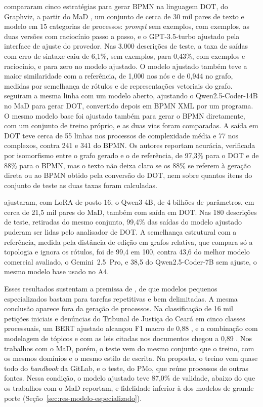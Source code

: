  compararam cinco estratégias para gerar BPMN na linguagem DOT, do Graphviz, a partir do MaD \cite{li2023mad}, um conjunto de cerca de 30 mil pares de texto e modelo em 15 categorias de processos: \textit{prompt} sem exemplos, com exemplos, as duas versões com raciocínio passo a passo, e o GPT-3.5-turbo ajustado pela interface de ajuste do provedor. Nas 3.000 descrições de teste, a taxa de saídas com erro de sintaxe caiu de 6,1\%, sem exemplos, para 0,43\%, com exemplos e raciocínio, e para zero no modelo ajustado. O modelo ajustado também teve a maior similaridade com a referência, de 1,000 nos nós e de 0,944 no grafo, medidas por semelhança de rótulos e de representações vetoriais do grafo.  seguiram a mesma linha com um modelo aberto, ajustando o Qwen2.5-Coder-14B no MaD para gerar DOT, convertido depois em BPMN XML por um programa. O mesmo modelo base foi ajustado também para gerar o BPMN diretamente, com um conjunto de treino próprio, e as duas vias foram comparadas. A saída em DOT teve cerca de 55 linhas nos processos de complexidade média e 77 nos complexos, contra 241 e 341 do BPMN. Os autores reportam acurácia, verificada por isomorfismo entre o grafo gerado e o de referência, de 97,3\% para o DOT e de 88\% para o BPMN, mas o texto não deixa claro se os 88\% se referem à geração direta ou ao BPMN obtido pela conversão do DOT, nem sobre quantos itens do conjunto de teste as duas taxas foram calculadas.

 ajustaram, com LoRA de posto 16, o Qwen3-4B, de 4 bilhões de parâmetros, em cerca de 21,5 mil pares do MaD, também com saída em DOT. Nas 180 descrições de teste, retiradas do mesmo conjunto, 99,4\% das saídas do modelo ajustado puderam ser lidas pelo analisador de DOT. A semelhança estrutural com a referência, medida pela distância de edição em grafos relativa, que compara só a topologia e ignora os rótulos, foi de 99,4 em 100, contra 43,6 do melhor modelo comercial avaliado, o Gemini~2.5~Pro, e 38,5 do Qwen2.5-Coder-7B sem ajuste, o mesmo modelo base usado no A4.

Esses resultados sustentam a premissa de , de que modelos pequenos especializados bastam para tarefas repetitivas e bem delimitadas. A mesma conclusão aparece fora da geração de processos. Na classificação de 16 mil petições iniciais e denúncias do Tribunal de Justiça do Ceará em cinco classes processuais, um BERT ajustado alcançou F1 macro de 0,88 \cite{aguiar2021text}, e a combinação com modelagem de tópicos e com as leis citadas nos documentos chegou a 0,89 \cite{aguiar2022topic}. Nos trabalhos com o MaD, porém, o teste vem do mesmo conjunto que o treino, com os mesmos domínios e o mesmo estilo de escrita. Na proposta, o treino vem quase todo do \textit{handbook} da GitLab, e o teste, do PMo, que reúne processos de outras fontes. Nessa condição, o modelo ajustado teve 87,0\% de validade, abaixo do que os trabalhos com o MaD reportam, e fidelidade inferior à dos modelos de grande porte (Seção~\ref{sec:res-modelo-especializado}).


